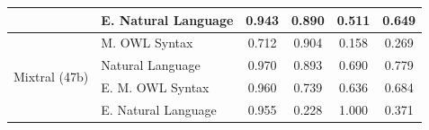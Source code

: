 \begin{table}[ht]
\begin{tabular}{|l|l|c|c|c|c|}
         & E. Natural Language                           & 0.943 & 0.890 & 0.511 & 0.649 \\ \cline{1-6}
        \hline
        \multirow{4}{*}{Mixtral (47b)}
         & \cellcolor[HTML]{EFEFEF} M. OWL Syntax     & \cellcolor[HTML]{EFEFEF} 0.712 & \cellcolor[HTML]{EFEFEF} 0.904 & \cellcolor[HTML]{EFEFEF} 0.158 & \cellcolor[HTML]{EFEFEF} 0.269 \\ \cline{2-6}
         & Natural Language                             & 0.970 & 0.893 & 0.690 & 0.779 \\ \cline{2-6}
         & \cellcolor[HTML]{EFEFEF} E. M. OWL Syntax   & \cellcolor[HTML]{EFEFEF} 0.960 & \cellcolor[HTML]{EFEFEF} 0.739 & \cellcolor[HTML]{EFEFEF} 0.636 & \cellcolor[HTML]{EFEFEF} 0.684 \\ \cline{2-6}
         & E. Natural Language                           & 0.955 & 0.228 & 1.000 & 0.371 \\ \cline{1-6}
        \hline
    \end{tabular}
\end{table}
